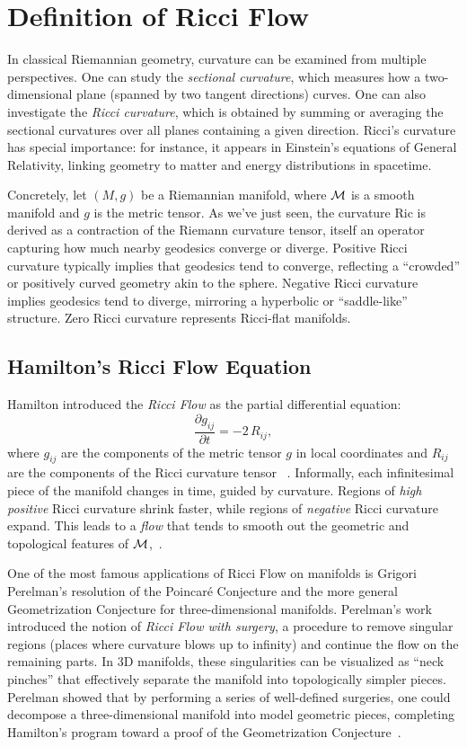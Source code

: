 \section{Definition of Ricci Flow}
In classical Riemannian geometry, curvature can be examined from multiple perspectives. One can study the \emph{sectional curvature}, which measures how a two-dimensional plane (spanned by two tangent directions) curves. One can also investigate the \emph{Ricci curvature}, which is obtained by summing or averaging the sectional curvatures over all planes containing a given direction. Ricci's curvature has special importance: for instance, it appears in Einstein's equations of General Relativity, linking geometry to matter and energy distributions in spacetime. 

Concretely, let $(M,g)$ be a Riemannian manifold, where $\mathcal{M}$ is a smooth manifold and $g$ is the metric tensor. As we've just seen, the curvature $\mathrm{Ric}$ is derived as a contraction of the Riemann curvature tensor, itself an operator capturing how much nearby geodesics converge or diverge. Positive Ricci curvature typically implies that geodesics tend to converge, reflecting a ``crowded'' or positively curved geometry akin to the sphere. Negative Ricci curvature implies geodesics tend to diverge, mirroring a hyperbolic or “saddle-like” structure. Zero Ricci curvature represents Ricci-flat manifolds.

\subsection{Hamilton's Ricci Flow Equation}
Hamilton introduced the \emph{Ricci Flow} as the partial differential equation:
\begin{equation}
\frac{\partial g_{ij}}{\partial t} = -2 \, R_{ij},
\end{equation}
where $g_{ij}$ are the components of the metric tensor $g$ in local coordinates and $R_{ij}$ are the components of the Ricci curvature tensor ~\cite{recentdevelopmentsricciflows}. Informally, each infinitesimal piece of the manifold changes in time, guided by curvature. Regions of \emph{high positive} Ricci curvature shrink faster, while regions of \emph{negative} Ricci curvature expand. This leads to a \emph{flow} that tends to smooth out the geometric and topological features of $\mathcal{M}$,~\cite{theRicciFlowAnIntroduction}.

One of the most famous applications of Ricci Flow on manifolds is Grigori Perelman's resolution of the Poincar\'{e} Conjecture and the more general Geometrization Conjecture for three-dimensional manifolds. Perelman's work introduced the notion of \emph{Ricci Flow with surgery}, a procedure to remove singular regions (places where curvature blows up to infinity) and continue the flow on the remaining parts. In 3D manifolds, these singularities can be visualized as ``neck pinches'' that effectively separate the manifold into topologically simpler pieces. Perelman showed that by performing a series of well-defined surgeries, one could decompose a three-dimensional manifold into model geometric pieces, completing Hamilton's program toward a proof of the Geometrization Conjecture~\cite{Perelman}.

